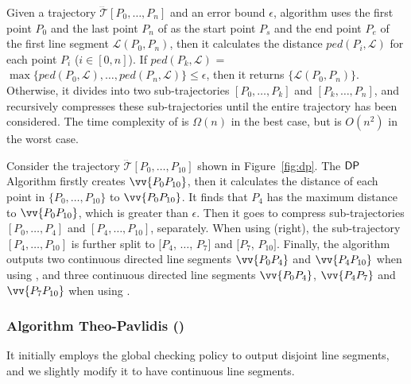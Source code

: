 Given a trajectory $\dddot{\mathcal{T}}[P_0, \ldots, P_n]$ and an error bound $\epsilon$,  algorithm \dpa uses the first point $P_0$ and the last point $P_n$ of  as the start point $P_s$ and the end point $P_e$ of the first line segment $\mathcal{L}(P_0, P_n)$, then it calculates the distance $ped(P_i, {\mathcal{L}})$ for each point $P_i$ ($i\in[0,n]$). If $ped(P_k, {\mathcal{L}})$ = $\max \{ped(P_0, {\mathcal{L}}), \ldots, ped(P_n, {\mathcal{L}}) \} \le \epsilon$, then it returns $\{\mathcal{L}(P_0,P_n)\}$. Otherwise, it divides  into two sub-trajectories $[P_0, \ldots, P_k]$ and $[P_{k}, \ldots, P_n]$, and recursively compresses these sub-trajectories until the entire trajectory has been considered.
%
The time complexity of \dpa is $\Omega(n)$ in the best case, but is $O(n^2)$ in the worst case.




\begin{example}
	\label{exm-alg-lsa}
	Consider the trajectory $\dddot{\mathcal{T}}[P_0,\ldots,P_{10}]$ shown in Figure~\ref{fig:dp}.
	The ${\mathsf{DP}}$ Algorithm firstly creates $\vv{P_0P_{10}}$, then it calculates the distance of each point in $\{P_0,\ldots,P_{10}\}$ to $\vv{P_0P_{10}}$.
	It finds that $P_{4}$ has the maximum distance to $\vv{P_0P_{10}}$, which is greater than $\epsilon$. Then it goes to compress sub-trajectories $[P_0, \ldots, P_{4}]$ and $[P_{4}, \ldots, P_{10}]$, separately.
	When using \sed (right), the sub-trajectory $[P_4,\ldots, P_{10}]$ is further split to $[P_4$, $\ldots$, $P_7]$ and $[P_7$, $P_{10}]$.
	Finally, the algorithm outputs two continuous directed line segments $\vv{P_0P_4}$ and $\vv{P_4P_{10}}$ when using \ped, and three continuous directed line segments $\vv{P_0P_4}$, $\vv{P_4P_7}$ and $\vv{P_7P_{10}}$ when using \sed.
\end{example}




\subsubsection{Algorithm Theo-Pavlidis  (\tpa) ~\cite{Pavlidis:Segment}}
It initially employs the global checking policy to output disjoint line segments, and we slightly modify it to have continuous line segments.

